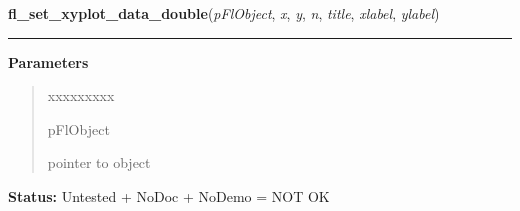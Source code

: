 \hspace{.8\funcindent}\begin{boxedminipage}{\funcwidth}

    \raggedright \textbf{fl\_set\_xyplot\_data\_double}(\textit{pFlObject}, \textit{x}, \textit{y}, \textit{n}, \textit{title}, \textit{xlabel}, \textit{ylabel})

    \vspace{-1.5ex}

    \rule{\textwidth}{0.5\fboxrule}
\setlength{\parskip}{2ex}
\setlength{\parskip}{1ex}
      \textbf{Parameters}
      \vspace{-1ex}

      \begin{quote}
        \begin{Ventry}{xxxxxxxxx}

          \item[pFlObject]

          pointer to object

        \end{Ventry}

      \end{quote}

\textbf{Status:} Untested + NoDoc + NoDemo = NOT OK



    \end{boxedminipage}

    \label{xformslib:flxyplot:fl_set_xyplot_file}

    \vspace{0.5ex}

